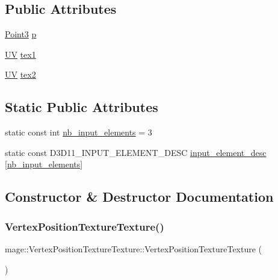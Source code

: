 \subsection*{Public Attributes}
\begin{DoxyCompactItemize}
\item 
\hyperlink{structmage_1_1_point3}{Point3} \hyperlink{structmage_1_1_vertex_position_texture_texture_aed106149eda65a20e60ebc3b93535270}{p}
\item 
\hyperlink{structmage_1_1_u_v}{UV} \hyperlink{structmage_1_1_vertex_position_texture_texture_a96be20a1f6ec9b9b74875099eef80f08}{tex1}
\item 
\hyperlink{structmage_1_1_u_v}{UV} \hyperlink{structmage_1_1_vertex_position_texture_texture_a5a41669f18385d932c1490ff20c80bed}{tex2}
\end{DoxyCompactItemize}
\subsection*{Static Public Attributes}
\begin{DoxyCompactItemize}
\item 
static const int \hyperlink{structmage_1_1_vertex_position_texture_texture_ac15391bbc084b6843ba3b9696b7f502a}{nb\+\_\+input\+\_\+elements} = 3
\item 
static const D3\+D11\+\_\+\+I\+N\+P\+U\+T\+\_\+\+E\+L\+E\+M\+E\+N\+T\+\_\+\+D\+E\+SC \hyperlink{structmage_1_1_vertex_position_texture_texture_a82f271622e34a209d7a3918e7a0190e4}{input\+\_\+element\+\_\+desc} \mbox{[}\hyperlink{structmage_1_1_vertex_position_texture_texture_ac15391bbc084b6843ba3b9696b7f502a}{nb\+\_\+input\+\_\+elements}\mbox{]}
\end{DoxyCompactItemize}


\subsection{Constructor \& Destructor Documentation}
\hypertarget{structmage_1_1_vertex_position_texture_texture_a4dd987362b64d278569f9bd043e2cb8b}{}\label{structmage_1_1_vertex_position_texture_texture_a4dd987362b64d278569f9bd043e2cb8b} 
\subsubsection{\texorpdfstring{Vertex\+Position\+Texture\+Texture()}{VertexPositionTextureTexture()}\hspace{0.1cm}{\footnotesize\ttfamily [1/4]}}
{\footnotesize\ttfamily mage\+::\+Vertex\+Position\+Texture\+Texture\+::\+Vertex\+Position\+Texture\+Texture (\begin{DoxyParamCaption}{ }\end{DoxyParamCaption})\hspace{0.3cm}{\ttfamily [default]}}

